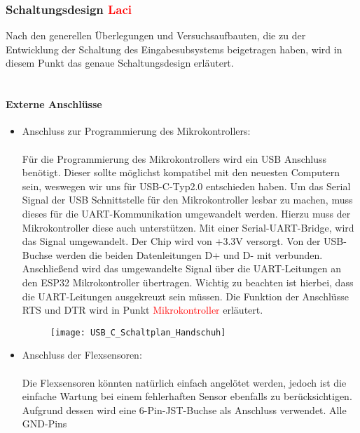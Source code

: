 \documentclass[titlepage,12pt,twoside]{article}
\begin{document}
\subsubsection{Schaltungsdesign \textcolor{red}{Laci}}
Nach den generellen Überlegungen und Versuchsaufbauten, die zu der Entwicklung der Schaltung des Eingabesubsystems beigetragen haben, wird in diesem Punkt 
das genaue Schaltungsdesign erläutert. \\
\\
\paragraph{Externe Anschlüsse}
\hfill \break
\hfill \break
\begin{itemize}
	\item Anschluss zur Programmierung des Mikrokontrollers: \\
		  \\
		  Für die Programmierung des Mikrokontrollers wird ein USB Anschluss benötigt. Dieser sollte möglichst kompatibel mit
		  den neuesten Computern sein, weswegen wir uns für USB-C-Typ2.0 entschieden haben. Um das Serial Signal der USB Schnittstelle
		  für den Mikrokontroller lesbar zu machen, muss dieses für die UART-Kommunikation umgewandelt werden. Hierzu muss der Mikrokontroller
		  diese auch unterstützen. Mit einer Serial-UART-Bridge, wird das Signal umgewandelt. Der Chip wird von +3.3V versorgt.
		  Von der USB-Buchse werden die beiden Datenleitungen D+ und D- mit verbunden. Anschließend wird das umgewandelte Signal 
		  über die UART-Leitungen an den ESP32 Mikrokontroller übertragen. Wichtig zu beachten ist hierbei, dass die UART-Leitungen
		  ausgekreuzt sein müssen. Die Funktion der Anschlüsse RTS und DTR wird in Punkt \textcolor{red}{Mikrokontroller} erläutert. \\
		  \begin{figure}[H]
			\begin{center}
				\scalebox{0.5}
				{\texttt{[image: USB\_C\_Schaltplan\_Handschuh]}}
			\end{center}
		\end{figure}
	\item Anschluss der Flexsensoren: \\
		  \\
		  Die Flexsensoren könnten natürlich einfach angelötet werden, jedoch ist die einfache Wartung bei einem fehlerhaften
		  Sensor ebenfalls zu berücksichtigen. Aufgrund dessen wird eine 6-Pin-JST-Buchse als Anschluss verwendet. Alle GND-Pins

\end{itemize}
\end{document}
